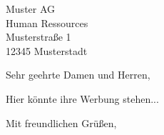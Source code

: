 \documentclass[sender, paper=a4, version=last, fontsize=11pt, DIV=13, BCOR=0mm]{scrlttr2}
\begin{document}


\begin{letter}{
    Muster AG \\
    Human Ressources \\
    Musterstraße 1\\
    12345 Musterstadt
}
\opening{Sehr geehrte Damen und Herren,}

Hier könnte ihre Werbung stehen... %


\closing{Mit freundlichen Grüßen,}
\end{letter}
\end{document}
